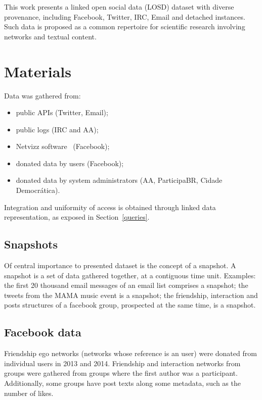 \documentclass[review]{elsarticle}
\begin{document}
This work presents a linked open social data (LOSD) dataset with diverse
provenance, including Facebook, Twitter, IRC, Email and detached
instances.
Such data is proposed as a common repertoire for scientific
research involving networks and textual content.


\section{Materials}\label{materials}
Data was gathered from:
\begin{itemize}
    \item public APIs (Twitter, Email);
    \item public logs (IRC and AA);
    \item Netvizz software~\cite{netvizz} (Facebook);
    \item donated data by users (Facebook);
    \item donated data by system administrators (AA, ParticipaBR, Cidade Democr\'atica).
\end{itemize}

Integration and uniformity of access is obtained through linked data
representation, as exposed in Section~\ref{queries}.

\subsection{Snapshots}
Of central importance to presented dataset is the concept of a snapshot.
A snapshot is a set of data gathered together, at a contiguous time
unit.
Examples: the first 20 thousand email messages of an email list
comprises a snapshot; the tweets from the MAMA music event is a
snapshot; the friendship, interaction and posts structures of a facebook
group, prospected at the same time, is a snapshot.

\subsection{Facebook data}
Friendship ego networks (networks whose reference is an user)
were donated from individual users in 2013 and 2014.
Friendship and interaction networks from groups were gathered from
groups where the first author was a participant.
Additionally, some groups have post texts along some metadata, such as
the number of likes.
\end{document}
